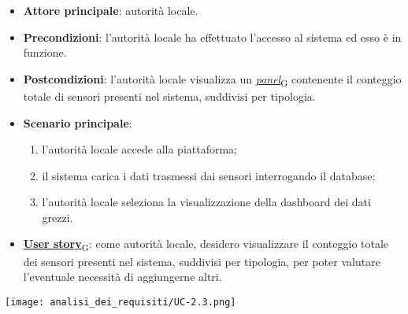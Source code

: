 \begin{itemize}
	\item \textbf{Attore principale}: autorità locale.
	\item \textbf{Precondizioni}: l'autorità locale ha effettuato l'accesso al sistema ed esso è in funzione.
	\item \textbf{Postcondizioni}: l'autorità locale visualizza un \href{https://7last.github.io/docs/rtb/documentazione-interna/glossario\#panel}{\textit{panel}\textsubscript{G}} contenente il conteggio totale di sensori presenti nel sistema, suddivisi per tipologia.
	\item \textbf{Scenario principale}:
	      \begin{enumerate}
		      \item l'autorità locale accede alla piattaforma;
		      \item il sistema carica i dati trasmessi dai sensori interrogando il database;
		      \item l'autorità locale seleziona la visualizzazione della dashboard dei dati grezzi.
	      \end{enumerate}
	\item \href{https://7last.github.io/docs/rtb/documentazione-interna/glossario\#user-story}{\textbf{User story}\textsubscript{G}}:
	      come autorità locale, desidero visualizzare il conteggio totale dei sensori presenti nel sistema, suddivisi per tipologia, per poter valutare l'eventuale necessità di aggiungerne altri.
\end{itemize}
\begin{center}
	\texttt{[image: analisi\_dei\_requisiti/UC-2.3.png]}
\end{center}

